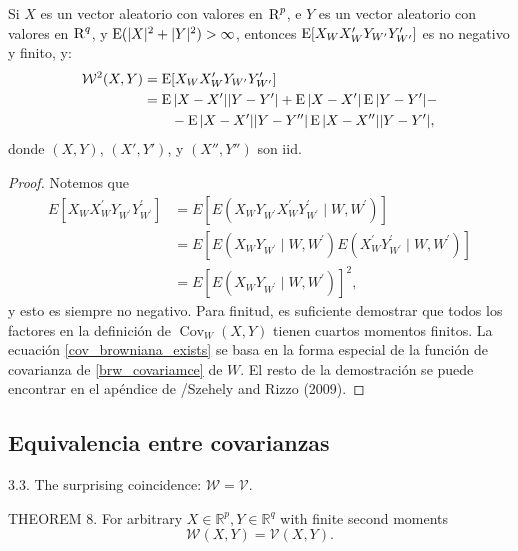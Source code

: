 		\begin{thm}
			Si $X$ es un vector aleatorio con valores en $\textsc{R}^p$, e $Y$ es un vector aleatorio con valores en $\textsc{R}^q$, y $\operatorname{E}(|X|^2+|Y|^2)>\infty$, entonces $\operatorname{E}[X_{W}X'_{W}Y_{W'}Y'_{W'}]$ es no negativo y finito, y:
			\begin{align}
				\mathcal{W}^2(X,Y) &= \operatorname{E}[X_{W}X'_{W}Y_{W'}Y'_{W'}]\\
								   &= \operatorname{E}|X-X'||Y-Y'| + \operatorname{E}|X-X'|\operatorname{E}|Y-Y'| - \label{cov_browniana_exists} \\ 
								   &\qquad - \operatorname{E}|X-X'||Y-Y''|\operatorname{E}|X-X''||Y-Y'|,
 			\end{align}
			donde $(X,Y)$, $(X',Y')$, y $(X'',Y'')$ son iid.
		\end{thm}
		\begin{proof}
			Notemos que
			$$
			\begin{aligned}
			E\left[X_W X_W^{\prime} Y_{W^{\prime}} Y_{W^{\prime}}^{\prime}\right] & =E\left[E\left(X_W Y_{W^{\prime}} X_W^{\prime} Y_{W^{\prime}}^{\prime} \mid W, W^{\prime}\right)\right] \\
			& =E\left[E\left(X_W Y_{W^{\prime}} \mid W, W^{\prime}\right) E\left(X_W^{\prime} Y_{W^{\prime}}^{\prime} \mid W, W^{\prime}\right)\right] \\
			& =E\left[E\left(X_W Y_{W^{\prime}} \mid W, W^{\prime}\right)\right]^2,
			\end{aligned}
			$$
			y esto es siempre no negativo. Para finitud, es suficiente demostrar que todos los factores en la definici\'on de  $\operatorname{Cov}_W(X, Y)$ tienen cuartos momentos finitos. La ecuaci\'on \ref{cov_browniana_exists} se basa en la forma especial de la funci\'on de covarianza de \ref{brw_covariamce} de $W$. El resto de la demostraci\'on se puede encontrar en el ap\'endice de /Szehely and Rizzo (2009)\cite{Szekely2009}.	
		\end{proof}

	\subsection{Equivalencia entre covarianzas}
	3.3. The surprising coincidence: $\mathcal{W}=\mathcal{V}$.

	THEOREM 8. For arbitrary $X \in \mathbb{R}^p, Y \in \mathbb{R}^q$ with finite second moments
	$$
	\mathcal{W}(X, Y)=\mathcal{V}(X, Y) .
	$$
	
